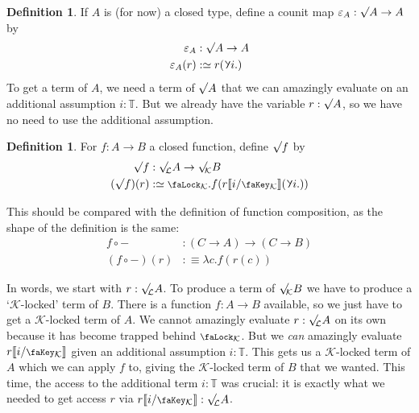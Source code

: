 \documentclass[10pt]{article}
\theoremstyle{definition}
\newtheorem{definition}[theorem]{Definition}
\let\oldequiv\equiv%
\renewcommand{\equiv}{\simeq}
\newcommand{\defeq}{\oldequiv}
\newcommand{\lock}{\mathchoice {\scalebox{0.8}{\text{\faLock}}}
  {\scalebox{0.8}{\text{\faLock}}} {\scalebox{0.5}{\text{\faLock}}}
  {\scalebox{0.4}{\text{\faLock}}} }
\newcommand{\key}{\mathchoice
  {\scalebox{0.8}{\text{\faKey}}} {\scalebox{0.8}{\text{\faKey}}}
  {\scalebox{0.5}{\text{\faKey}}} {\scalebox{0.4}{\text{\faKey}}} }
\newcommand{\rbindsym}{\raisebox{-0.5pt}{\scalerel*{\reflectbox{\rotatebox[origin=c]{185}{$\lambda$}}}{\lambda}}}
\newcommand{\rbind}[1]{\rbindsym{} #1.}
\newcommand{\Tiny}{\mathbb{T}}
\newcommand{\lockn}[1]{\mathcal{#1}}
\newcommand{\ctxlocke}[1]{\lock_{#1}}
\newcommand{\ctxlock}[1]{\ctxlocke{\lockn{#1}}}
\newcommand{\stubra}[1]{\llbracket #1 \rrbracket}
\newcommand{\substucke}[2]{\stubra{#1/\key_{#2}}}
\newcommand{\substuck}[2]{\substucke{#1}{\lockn{#2}}}
\newcommand{\rformsym}{\surd}
\newcommand{\rforme}[2]{\ThisStyle{\raisebox{0.07em}{$\SavedStyle \rformsym_{\hspace{-0.25em}#1}$}} #2}
\newcommand{\rform}[2]{\rforme{\lockn{#1}}{#2}}
\newcommand{\rformu}[1]{\ThisStyle{\raisebox{0.07em}{$\SavedStyle \rformsym$}} #1}
\newcommand{\rintroe}[2]{\lock_{#1}. #2}
\newcommand{\rintro}[2]{\rintroe{\lockn{#1}}{#2}}
\newcommand{\relim}[1]{\rbindsym #1}
\begin{document}
\begin{definition}
  If $A$ is (for now) a closed type, define a counit map
  $\varepsilon_A : \rformu{A} \to A$ by
  \begin{align*}
    \varepsilon_A &: \rformu{A} \to A \\
    \varepsilon_A(r) &:\defeq r(\rbind{i})
  \end{align*}
  To get a term of $A$, we need a term of $\rformu{A}$ that we can
  amazingly evaluate on an additional assumption $i : \Tiny$. But we
  already have the variable $r : \rformu{A}$, so we have no
  need to use the additional assumption.
\end{definition}

\begin{definition}
  For $f : A \to B$ a closed function, define $\rformu f$ by
  \begin{align*}
    \rformu f &: \rform{L} A \to \rform{K} B \\
    (\rformu f)(r) &:\defeq \rintro{K}{f(r\substuck{i}{K}(\rbind{i}))}
  \end{align*}
\end{definition}

This should be compared with the definition of function composition,
as the shape of the definition is the same:
\begin{align*}
  f \circ - &: (C \to A) \to (C \to B) \\
  (f \circ -)(r) &:\defeq \lambda c. f(r(c))
\end{align*}

In words, we start with $r : \rform{L} A$. To produce a term of
$\rform{K} B$ we have to produce a `$\lockn{K}$-locked' term of $B$.
There is a function $f : A \to B$ available, so we just have to get a
$\lockn{K}$-locked term of $A$. We cannot amazingly evaluate
$r : \rform{L} A$ on its own because it has become trapped behind
$\ctxlock{K}$. But we \emph{can} amazingly evaluate $r\substuck{i}{K}$
given an additional assumption $i : \Tiny$. This gets us a
$\lockn{K}$-locked term of $A$ which we can apply $f$ to, giving the
$\lockn{K}$-locked term of $B$ that we wanted. This time, the access
to the additional term $i : \Tiny$ was crucial: it is exactly what we
needed to get access $r$ via $r\substuck{i}{K} : \rform{L}{A}$.
\end{document}
